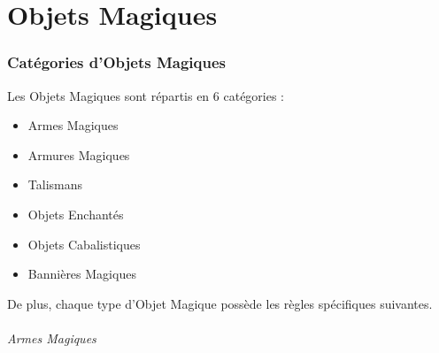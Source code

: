 
\newcommand{\backlashscroll}{Parchemin de Retour de Flamme}
\newcommand{\bookofarcanepower}{Grimoire de Puissance Cabalistique}
\newcommand{\essenceofafreemind}{Essence de Libre Pensée}
\newcommand{\dispelscroll}{Parchemin de Dissipation}
\newcommand{\tomeofarcanelore}{Grimoire de Connaissance Mystique}
\newcommand{\groundingrod}{Baguette Tellurique}
\newcommand{\sceptreofpower}{Sceptre de Pouvoir}
\newcommand{\bindingscroll}{Parchemin d'Entrave}
\newcommand{\shieldingscroll}{Parchemin de Protection}
\newcommand{\wandofstability}{Baguette de Stabilité}


\newcommand{\rendingbanner}{Bannière de Rasoirs}
\newcommand{\stalkersstandard}{Étendard du Pisteur}
\newcommand{\aethericon}{Icône d'Æther}
\newcommand{\holyicon}{Icône Divine}
\newcommand{\bannerofdiscipline}{Bannière de Discipline}
\newcommand{\bannerofspeed}{Bannière de Vitesse}
\newcommand{\flamingstandard}{Bannière de Feu}
\newcommand{\warstandard}{Étendard de Guerre}
\newcommand{\iconoftherelentlesscompany}{Icône de la Compagnie Implacable}
\newcommand{\gleamingicon}{Icône Étincelante}
\newcommand{\bannerofcourage}{Bannière de Courage}



\part{Objets Magiques}

\section{Catégories d'Objets Magiques}

Les Objets Magiques sont répartis en 6 catégories :
\begin{itemize}[label={\textbullet}]
\item Armes Magiques
\item Armures Magiques
\item Talismans
\item Objets Enchantés
\item Objets Cabalistiques
\item Bannières Magiques
\end{itemize}

De plus, chaque type d'Objet Magique possède les règles spécifiques suivantes.

\paragraph{Armes Magiques}


